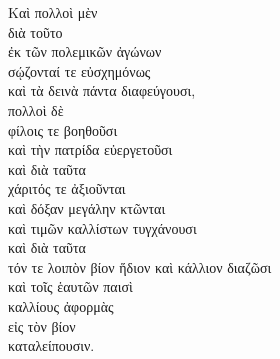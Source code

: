 
{\large
\begin{greek}
\noindent Καὶ πολλοὶ μὲν \\
\tabto{4em} διὰ τοῦτο \\
\tabto{4em} ἐκ τῶν πολεμικῶν ἀγώνων \\
\tabto{2em} σῴζονταί τε εὐσχημόνως \\
\tabto{2em} καὶ τὰ δεινὰ πάντα διαφεύγουσι, \\
πολλοὶ δὲ \\
\tabto{2em} φίλοις τε βοηθοῦσι \\
\tabto{2em} καὶ τὴν πατρίδα εὐεργετοῦσι \\
\tabto{2em} καὶ διὰ ταῦτα \\
\tabto{4em} χάριτός τε ἀξιοῦνται \\
\tabto{4em} καὶ δόξαν μεγάλην κτῶνται \\
\tabto{4em} καὶ τιμῶν καλλίστων τυγχάνουσι \\
\tabto{2em} καὶ διὰ ταῦτα \\
\tabto{4em} τόν τε λοιπὸν βίον ἥδιον καὶ κάλλιον διαζῶσι \\
\tabto{4em} καὶ τοῖς ἑαυτῶν παισὶ \\
\tabto{6em} καλλίους ἀφορμὰς \\
\tabto{6em} εἰς τὸν βίον \\
\tabto{4em} καταλείπουσιν.\\

\end{greek}
}


